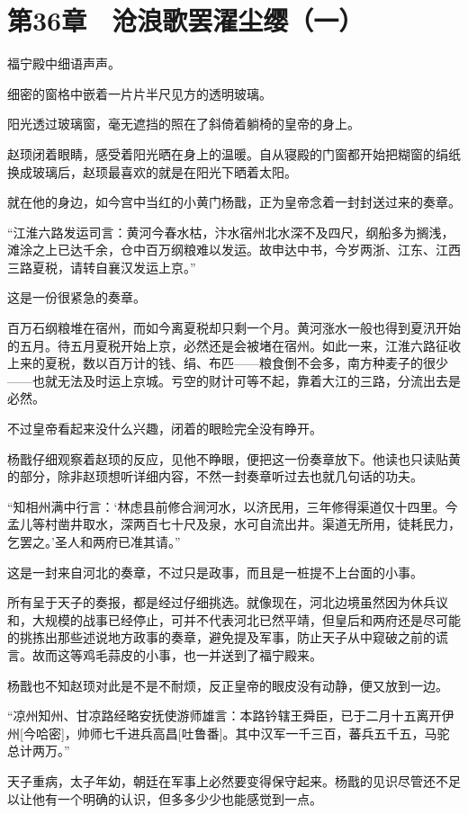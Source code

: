 \section{第36章　沧浪歌罢濯尘缨（一）}

福宁殿中细语声声。

细密的窗格中嵌着一片片半尺见方的透明玻璃。

阳光透过玻璃窗，毫无遮挡的照在了斜倚着躺椅的皇帝的身上。

赵顼闭着眼睛，感受着阳光晒在身上的温暖。自从寝殿的门窗都开始把糊窗的绢纸换成玻璃后，赵顼最喜欢的就是在阳光下晒着太阳。

就在他的身边，如今宫中当红的小黄门杨戬，正为皇帝念着一封封送过来的奏章。

“江淮六路发运司言：黄河今春水枯，汴水宿州北水深不及四尺，纲船多为搁浅，滩涂之上已达千余，仓中百万纲粮难以发运。故申达中书，今岁两浙、江东、江西三路夏税，请转自襄汉发运上京。”

这是一份很紧急的奏章。

百万石纲粮堆在宿州，而如今离夏税却只剩一个月。黄河涨水一般也得到夏汛开始的五月。待五月夏税开始上京，必然还是会被堵在宿州。如此一来，江淮六路征收上来的夏税，数以百万计的钱、绢、布匹——粮食倒不会多，南方种麦子的很少——也就无法及时运上京城。亏空的财计可等不起，靠着大江的三路，分流出去是必然。

不过皇帝看起来没什么兴趣，闭着的眼睑完全没有睁开。

杨戬仔细观察着赵顼的反应，见他不睁眼，便把这一份奏章放下。他读也只读贴黄的部分，除非赵顼想听详细内容，不然一封奏章听过去也就几句话的功夫。

“知相州满中行言：‘林虑县前修合涧河水，以济民用，三年修得渠道仅十四里。今孟儿等村凿井取水，深两百七十尺及泉，水可自流出井。渠道无所用，徒耗民力，乞罢之。’圣人和两府已准其请。”

这是一封来自河北的奏章，不过只是政事，而且是一桩提不上台面的小事。

所有呈于天子的奏报，都是经过仔细挑选。就像现在，河北边境虽然因为休兵议和，大规模的战事已经停止，可并不代表河北已然平靖，但皇后和两府还是尽可能的挑拣出那些述说地方政事的奏章，避免提及军事，防止天子从中窥破之前的谎言。故而这等鸡毛蒜皮的小事，也一并送到了福宁殿来。

杨戬也不知赵顼对此是不是不耐烦，反正皇帝的眼皮没有动静，便又放到一边。

“凉州知州、甘凉路经略安抚使游师雄言：本路钤辖王舜臣，已于二月十五离开伊州[今哈密]，帅师七千进兵高昌[吐鲁番]。其中汉军一千三百，蕃兵五千五，马驼总计两万。”

天子重病，太子年幼，朝廷在军事上必然要变得保守起来。杨戬的见识尽管还不足以让他有一个明确的认识，但多多少少也能感觉到一点。

